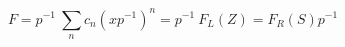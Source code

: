 \begin{equation}
F=p^{-1}~\sum_{n} c_{n} (xp^{-1})^{n} = p^{-1}~F_{L}(Z)=F_{R}(S)p^{-1}
\end{equation}


